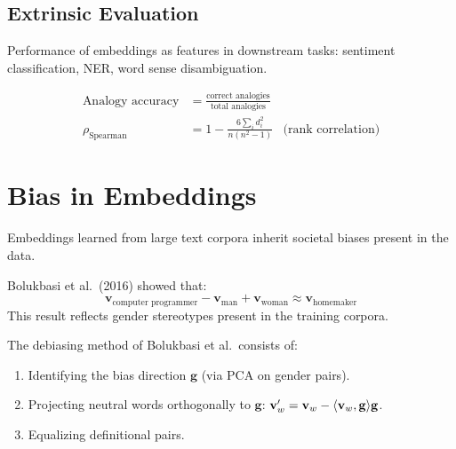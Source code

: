 \subsection{Extrinsic Evaluation}

Performance of embeddings as features in downstream tasks: sentiment
classification, NER, word sense disambiguation.

\begin{keyformulas}[title=\textbf{Embedding evaluation metrics}]
\begin{align}
\text{Analogy accuracy} &= \frac{\text{correct analogies}}{\text{total analogies}} \\
\rho_{\text{Spearman}} &= 1 - \frac{6 \sum_i d_i^2}{n(n^2 - 1)} & \text{(rank correlation)}
\end{align}
\end{keyformulas}

\section{Bias in Embeddings}
\label{sec:emb:bias}

Embeddings learned from large text corpora inherit societal biases present in
the data.

\begin{example}
Bolukbasi et al.\ (2016) showed that:
\[
\mathbf{v}_{\text{computer programmer}} - \mathbf{v}_{\text{man}} + \mathbf{v}_{\text{woman}} \approx \mathbf{v}_{\text{homemaker}}
\]
This result reflects gender stereotypes present in the training corpora.
\end{example}

\begin{definition}
The debiasing method of Bolukbasi et al.\ consists of:
\begin{enumerate}
    \item Identifying the bias direction $\mathbf{g}$ (via PCA on gender pairs).
    \item Projecting neutral words orthogonally to $\mathbf{g}$:
          $\mathbf{v}_w' = \mathbf{v}_w - \langle \mathbf{v}_w, \mathbf{g} \rangle \mathbf{g}$.
    \item Equalizing definitional pairs.
\end{enumerate}
\end{definition}

